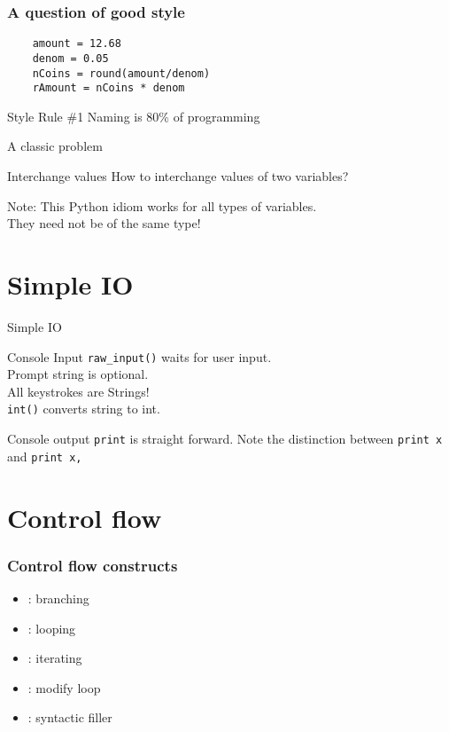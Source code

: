 \documentclass[14pt,compress]{beamer}
\newcounter{time}
\newcommand{\inctime}[1]{\addtocounter{time}{#1}{\tiny \thetime\ m}}
\newcommand{\kwrd}[1]{ \texttt{\textbf{\color{blue}{#1}}}  }
\begin{document}
\begin{frame}[fragile] \frametitle{A question of good style}
  \begin{lstlisting}
    amount = 12.68
    denom = 0.05
    nCoins = round(amount/denom)
    rAmount = nCoins * denom
  \end{lstlisting}
  \pause
  \begin{block}{Style Rule \#1}
    Naming is 80\% of programming
  \end{block}
\end{frame}

\begin{frame}
  {A classic problem}
  \begin{block}
    {Interchange values}
    How to interchange values of two variables? 
  \end{block}
  \pause
  \begin{block}{Note:}
    This Python idiom works for all types of variables.\\
They need not be of the same type!
  \end{block}
  \inctime{10}
\end{frame}

\section{Simple IO}
\begin{frame}{Simple IO}
  \begin{block}
    {Console Input}
    \texttt{raw\_input()} waits for user input.\\Prompt string is optional.\\
    All keystrokes are Strings!\\\texttt{int()} converts string to int.
  \end{block}
  \begin{block}
    {Console output}
    \texttt{print} is straight forward. Note the distinction between \texttt{print x} and \texttt{print x,}
  \end{block}
\end{frame}

\section{Control flow}
\begin{frame}
  \frametitle{Control flow constructs}  
  \begin{itemize}
  \item \kwrd{if/elif/else}: branching
  \item \kwrd{while}: looping
  \item \kwrd{for}: iterating 
  \item \kwrd{break, continue}: modify loop 
  \item \kwrd{pass}: syntactic filler
  \end{itemize}
\end{frame}
\end{document}
